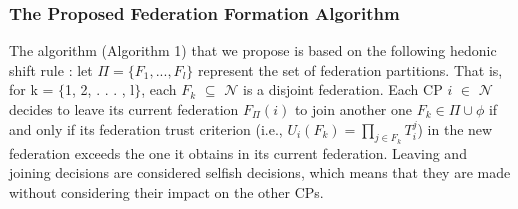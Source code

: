 \documentclass[preprint]{elsarticle}
\theoremstyle{definition}
\theoremstyle{remark}
\theoremstyle{property}
\begin{document}
\subsubsection{The Proposed Federation Formation Algorithm}

The algorithm (Algorithm 1) that we propose is based on the following
hedonic shift rule \cite{bogomolnaia2002stability}: let
$\Pi = \{F_{1}, . . . , F_{l}\}$ represent the set of federation partitions. That is, for k = $\{$1, 2, . . . , l$\}$, each $F_{k}$ $\subseteq$ $\mathcal{N}$ is a disjoint federation. Each CP $i$ $\in$ $\mathcal{N}$ decides to leave its current
federation $F_{\Pi}(i)$ to join another one $F_{k} \in \Pi \cup \phi$ if and
only if its federation trust criterion (i.e., $U_{i}(F_{k}) = \prod _{j\in F_{k}} T_{i}^{j}$) in
the new federation exceeds the one it obtains in its
current federation. Leaving and joining decisions are considered selfish decisions, which means that they are made without considering their impact on the other CPs.


\end{document}
